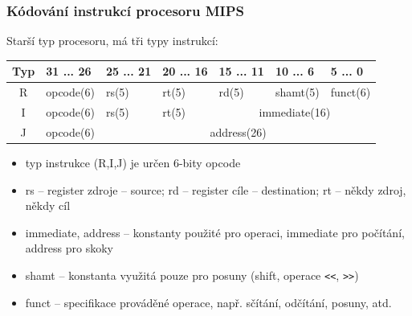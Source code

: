 \documentclass{beamer}
\begin{document}
\begin{frame}
\frametitle{Kódování instrukcí procesoru MIPS}

Starší typ procesoru, má tři typy instrukcí:

\begin{tabular}{|c|l|l|l|l|l|l|}\hline
Typ & 31 ... 26 & 25 ... 21 & 20 ... 16 & 15 ... 11 & 10 ... 6 & 5 ... 0 \\ \hline
R & opcode(6) & rs(5) & rt(5) & rd(5) & shamt(5) & funct(6) \\ \hline
I & opcode(6) & rs(5) & rt(5) & \multicolumn{3}{c|}{ immediate(16)} \\ \hline
J & opcode(6) & \multicolumn{5}{c|}{ address(26)} \\ \hline
\end{tabular}

\begin{itemize}
\item typ instrukce (R,I,J) je určen 6-bity opcode
\item rs -- register zdroje -- source; rd -- register cíle -- destination; rt -- někdy zdroj, někdy cíl
\item immediate, address -- konstanty použité pro operaci, immediate pro počítání, address pro skoky 
\item shamt -- konstanta využitá pouze pro posuny (shift, operace \texttt{<<}, \texttt{>>})
\item funct -- specifikace prováděné operace, např. sčítání, odčítání, posuny, atd.
\end{itemize}

\end{frame}
\end{document}
